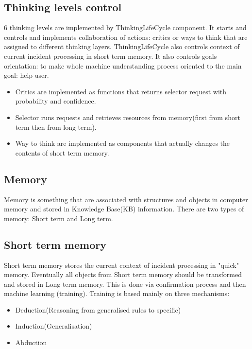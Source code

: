 \documentclass[conference]{IEEEtran}
\begin{document}
\subsection{Thinking levels control}

6 thinking levels are implemented by ThinkingLifeCycle component. It starts and controls and implements collaboration of actions: critics or ways to think that are assigned to different thinking layers. ThinkingLifeCycle also controls context of current incident processing in short term memory. It also controls goals orientation: to make whole machine understanding process oriented to the main goal: help user.\\

\begin{itemize}
  \item Critics are implemented as functions that returns selector request with probability and confidence.
  \item Selector runs requests and retrieves resources from memory(first from short term then from long term).
  \item Way to think are implemented as components that actually changes the contents of short term memory.
\end{itemize}

\subsection{Memory}

Memory is something that are associated with structures and objects in computer memory and stored in Knowledge Base(KB) information.
There are two types of memory: Short term and Long term.

\subsection{Short term memory}

Short term memory stores the current context of incident processing in "quick" memory. Eventually all objects from Short term memory should be transformed and stored in Long term memory. This is done via confirmation process and then machine learning (training).
Training is based mainly on three mechanisms:
\begin{itemize}
  \item Deduction(Reasoning from generalised rules to specific)
  \item Induction(Generalisation)
  \item Abduction
\end{itemize}
\end{document}
